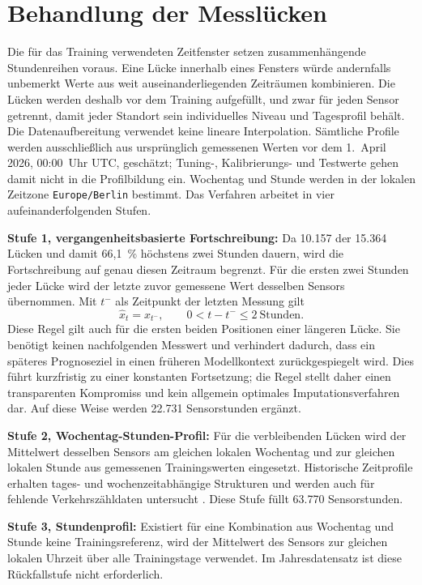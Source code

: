 \section{Behandlung der Messlücken}
\label{sec:Methode_Imputation}

Die für das Training verwendeten Zeitfenster setzen zusammenhängende
Stundenreihen voraus. Eine Lücke innerhalb eines Fensters würde andernfalls
unbemerkt Werte aus weit auseinanderliegenden Zeiträumen kombinieren. Die
Lücken werden deshalb vor dem Training aufgefüllt, und zwar für jeden Sensor
getrennt, damit jeder Standort sein individuelles Niveau und Tagesprofil
behält. Die Datenaufbereitung verwendet keine lineare Interpolation. Sämtliche
Profile werden ausschließlich aus ursprünglich gemessenen Werten vor dem
1.~April 2026, 00:00~Uhr UTC, geschätzt; Tuning-, Kalibrierungs- und
Testwerte gehen damit nicht in die Profilbildung ein. Wochentag und Stunde
werden in der lokalen Zeitzone \texttt{Europe/Berlin} bestimmt. Das Verfahren
arbeitet in vier aufeinanderfolgenden Stufen.

\textbf{Stufe 1, vergangenheitsbasierte Fortschreibung:} Da 10.157 der 15.364
Lücken und damit 66{,}1~\% höchstens zwei Stunden dauern, wird die
Fortschreibung auf genau diesen Zeitraum begrenzt. Für die ersten zwei Stunden
jeder Lücke wird der letzte zuvor gemessene Wert desselben Sensors übernommen.
Mit $t^{-}$ als Zeitpunkt der letzten Messung gilt
\begin{equation}
  \hat{x}_t=x_{t^{-}}, \qquad 0<t-t^{-}\leq 2\ \text{Stunden}.
\end{equation}
Diese Regel gilt auch für die ersten beiden Positionen einer längeren Lücke.
Sie benötigt keinen nachfolgenden Messwert und verhindert dadurch, dass ein
späteres Prognoseziel in einen früheren Modellkontext zurückgespiegelt wird.
Dies führt kurzfristig zu einer konstanten Fortsetzung; die Regel stellt daher
einen transparenten Kompromiss und kein allgemein optimales
Imputationsverfahren dar. Auf diese Weise werden 22.731 Sensorstunden ergänzt.

\textbf{Stufe 2, Wochentag-Stunden-Profil:} Für die verbleibenden Lücken wird
der Mittelwert desselben Sensors am gleichen lokalen Wochentag und zur gleichen
lokalen Stunde aus gemessenen Trainingswerten eingesetzt. Historische
Zeitprofile erhalten tages- und wochenzeitabhängige Strukturen und werden auch
für fehlende Verkehrszähldaten untersucht \cite{sun_traffic_2022}. Diese Stufe
füllt 63.770 Sensorstunden.

\textbf{Stufe 3, Stundenprofil:} Existiert für eine Kombination aus Wochentag
und Stunde keine Trainingsreferenz, wird der Mittelwert des Sensors zur
gleichen lokalen Uhrzeit über alle Trainingstage verwendet. Im Jahresdatensatz
ist diese Rückfallstufe nicht erforderlich.

